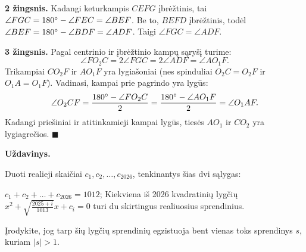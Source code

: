 \documentclass[11pt, a4paper]{scrreprt}
\newenvironment{problem}
    {\par\medskip\noindent\textbf{Uždavinys.}\par\smallskip}
    {\par\medskip}
\begin{document}
\textbf{2 žingsnis.} Kadangi keturkampis $CEFG$ įbrėžtinis, tai $\angle FGC = 180^\circ - \angle FEC = \angle BEF$. Be to, $BEFD$ įbrėžtinis, todėl $\angle BEF = 180^\circ - \angle BDF = \angle ADF$. Taigi $\angle FGC = \angle ADF$.
\begin{center}
\end{center}

\textbf{3 žingsnis.} Pagal centrinio ir įbrėžtinio kampų sąryšį turime:
\begin{equation*}
\angle FO_2C = 2\angle FGC = 2\angle ADF = \angle AO_1F.
\end{equation*}
Trikampiai $CO_2F$ ir $AO_1F$ yra lygiašoniai (nes spinduliai $O_2C=O_2F$ ir $O_1A=O_1F$).
Vadinasi, kampai prie pagrindo yra lygūs:
\begin{equation*}
\angle O_2CF = \frac{180^\circ - \angle FO_2C}{2} = \frac{180^\circ - \angle AO_1F}{2} = \angle O_1AF.
\end{equation*}
Kadangi priešiniai ir atitinkamieji kampai lygūs, tiesės $AO_1$ ir $CO_2$ yra lygiagrečios. \hfill $\blacksquare$

\vspace{1cm}

\begin{problem}
Duoti realieji skaičiai $c_1, c_2, \dots, c_{2026}$, tenkinantys šias dvi sąlygas:
\begin{enumerate}[label=(\arabic*)]
    \ii $c_1 + c_2 + \dots + c_{2026} = 1012$;
    \ii Kiekviena iš 2026 kvadratinių lygčių $x^2 + \sqrt{\frac{2025+i}{1013}}x + c_i = 0$ turi du skirtingus realiuosius sprendinius.
\end{enumerate}
Įrodykite, jog tarp šių lygčių sprendinių egzistuoja bent vienas toks sprendinys $s$, kuriam $|s| > 1$.
\end{problem}
\end{document}
